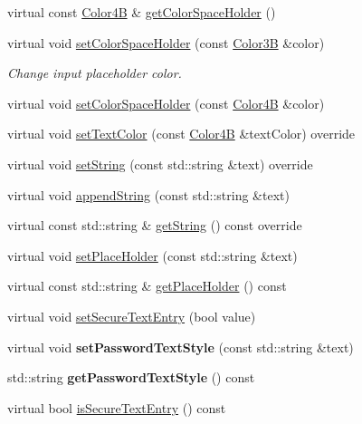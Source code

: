 \begin{DoxyCompactItemize}
\item 
virtual const \hyperlink{structColor4B}{Color4B} \& \hyperlink{classTextFieldTTF_a066e3d650024862675c565b4a44843c6}{get\+Color\+Space\+Holder} ()
\item 
virtual void \hyperlink{classTextFieldTTF_a4a44970abe58917d7c09775a50e5e06d}{set\+Color\+Space\+Holder} (const \hyperlink{structColor3B}{Color3B} \&color)
\begin{DoxyCompactList}\small\item\em Change input placeholder color. \end{DoxyCompactList}\item 
virtual void \hyperlink{classTextFieldTTF_a6f376d7c8856c2263d5eb2ef247359dd}{set\+Color\+Space\+Holder} (const \hyperlink{structColor4B}{Color4B} \&color)
\item 
virtual void \hyperlink{classTextFieldTTF_a922f50aac8989d42977d1db5fe63da95}{set\+Text\+Color} (const \hyperlink{structColor4B}{Color4B} \&text\+Color) override
\item 
virtual void \hyperlink{classTextFieldTTF_a9c8fcddd94799ace845dc808d1246d7b}{set\+String} (const std\+::string \&text) override
\item 
virtual void \hyperlink{classTextFieldTTF_aeaa280136373197c96b63209ba98fcc6}{append\+String} (const std\+::string \&text)
\item 
virtual const std\+::string \& \hyperlink{classTextFieldTTF_a262a78ec2ef963b2fef8fcde2edc0895}{get\+String} () const override
\item 
virtual void \hyperlink{classTextFieldTTF_a2d580797c1d8d72272228a042c8215f1}{set\+Place\+Holder} (const std\+::string \&text)
\item 
virtual const std\+::string \& \hyperlink{classTextFieldTTF_a92642716c8e8e2049f799b0f90835da4}{get\+Place\+Holder} () const
\item 
virtual void \hyperlink{classTextFieldTTF_aee12da5f6c3bbc77ab6d144245f750b5}{set\+Secure\+Text\+Entry} (bool value)
\item 
\mbox{\label{classTextFieldTTF_a8688984d6d4815944529b65492489b05}} 
virtual void {\bfseries set\+Password\+Text\+Style} (const std\+::string \&text)
\item 
\mbox{\label{classTextFieldTTF_ab0e9100f6e4e162f5ad5f3043d1b3e91}} 
std\+::string {\bfseries get\+Password\+Text\+Style} () const
\item 
virtual bool \hyperlink{classTextFieldTTF_a5ec469fe877a2fd10d7787034a7a35a0}{is\+Secure\+Text\+Entry} () const

\end{DoxyCompactItemize}

